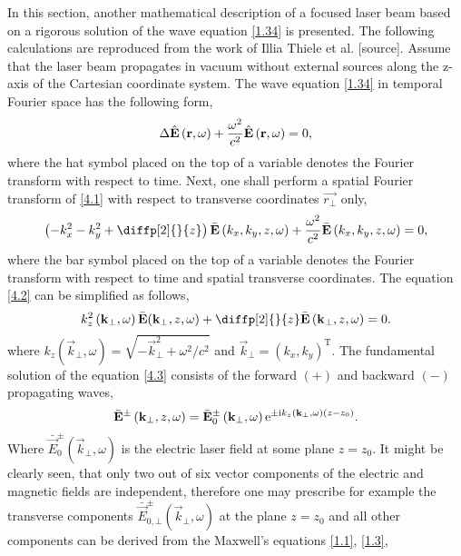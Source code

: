 In this section, another mathematical description of a focused laser beam based on a rigorous solution of the wave equation \ref{1.34} is presented. The following calculations are reproduced from the work of Illia Thiele et al. [source]. Assume that the laser beam propagates in vacuum without external sources along the z-axis of the Cartesian coordinate system. The wave equation \ref{1.34} in temporal Fourier space has the following form,
\begin{equation}
\label{4.1}
\Delta \hat{\mathbf{E}} \left(\mathbf{r}, \omega \right) + \frac{\omega^2}{c^2} \hat{\mathbf{E}} \left(\mathbf{r}, \omega \right) = 0,
\end{equation}
where the hat symbol placed on the top of a variable denotes the Fourier transform with respect to time. Next, one shall perform a spatial Fourier transform of \ref{4.1} with respect to transverse coordinates $ \vec{r_\bot} $ only,
\begin{equation}
\label{4.2}
\left(- k^2_x - k^2_y + \diffp[2]{}{z} \right) \bar{\vec{E}} \left(k_x, k_y, z, \omega \right) + \frac{\omega^2}{c^2} \bar{\vec{E}} \left(k_x, k_y, z, \omega \right) = 0,
\end{equation}
where the bar symbol placed on the top of a variable denotes the Fourier transform with respect to time and spatial transverse coordinates. The equation \ref{4.2} can be simplified as follows,
\begin{equation}
\label{4.3}
k^2_z \left(\vec{k}_\bot, \omega \right) \bar{\vec{E}}(\vec{k}_\bot, z, \omega) + \diffp[2]{}{z} \bar{\vec{E}} \left(\vec{k}_\bot, z, \omega \right) = 0.
\end{equation}
where $ k_z \left(\vec{k}_\bot, \omega \right) = \sqrt{-\vec{k}_\bot^2 + \omega^2/c^2} $ and $ \vec{k}_\bot = (k_x, k_y)^{\mathrm{T}} $. The fundamental solution of the equation \ref{4.3} consists of the forward $ (+) $ and backward $ (-) $ propagating waves,
\begin{equation}
\label{4.4}
\bar{\mathbf{E}}^{\pm} \left(\mathbf{k}_\bot, z, \omega \right) = \bar{\mathbf{E}}_{0}^{\pm} \left(\mathbf{k}_\bot, \omega \right) \mathrm{e}^{\pm \mathrm{i} k_z \left(\mathbf{k}_\bot, \omega \right) \left(z - z_0 \right)}.
\end{equation}
Where $ \bar{\vec{E}}_{0}^{\pm}\left(\vec{k}_\bot, \omega \right) $ is the electric laser field at some plane $ z = z_0 $. It might be clearly seen, that only two out of six vector components of the electric and magnetic fields are independent, therefore one may prescribe for example the transverse components $ \bar{\vec{E}}_{0, \bot}^{\pm}\left(\vec{k}_\bot, \omega \right) $ at the plane $ z = z_0 $ and all other components can be derived from the Maxwell's equations \ref{1.1}, \ref{1.3},
